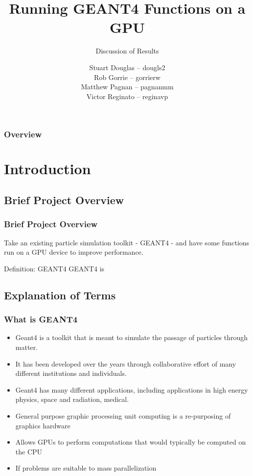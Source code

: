 \documentclass{beamer}
\title[GEANT4-GPU (McMaster University)]{Running GEANT4 Functions on a GPU}
\subtitle{Discussion of Results}
\institute{McMaster University}
\author[S. Douglas, R. Gorrie, M .Pagnan, V. Reginato]{
Stuart Douglas -- dougls2
\\Rob Gorrie -- gorrierw
\\Matthew Pagnan -- pagnanmm
\\Victor Reginato -- reginavp
}
\begin{document}
\frame{\titlepage}
\begin{frame}
\frametitle{Overview}
\tableofcontents
\end{frame}

\section{Introduction} 

\subsection{Brief Project Overview}
\begin{frame}
\frametitle{Brief Project Overview}
Take an existing particle simulation toolkit - GEANT4 - and have some functions run on a GPU device to improve performance.
\begin{block}{Definition: GEANT4}
GEANT4 is 
\end{block}
\end{frame}

\subsection{Explanation of Terms}
\begin{frame}
\frametitle{What is GEANT4}
\begin{itemize}
\item Geant4 is a toolkit that is meant to simulate the passage of particles through matter. 
\item It has been developed over the years through collaborative effort of many different institutions and individuals. 
\item Geant4 has many different applications, including applications in high energy physics, space and radiation, medical. 
\end{itemize}
\end{frame}

\begin{frame}
\begin{itemize}
\frametitle{What is GP-GPU}
\item General purpose graphic processing unit computing is a re-purposing of graphics hardware
\item Allows GPUs  to perform computations that would typically be computed on the CPU
\item If problems are suitable to mass parallelization 
\end{itemize}
\end{frame}
\end{document}
